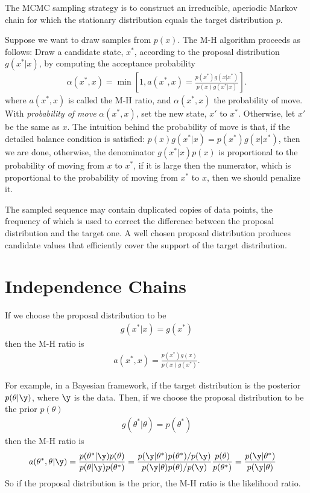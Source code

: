 \documentclass{article}
\begin{document}
The MCMC sampling strategy is to construct an irreducible, aperiodic Markov chain for which the stationary distribution equals the target distribution $p$.

Suppose we want to draw samples from $p(x)$. The M-H algorithm proceeds as follows: Draw a candidate state, $x^*$, according to the proposal distribution $g(x^*|x)$, by computing the acceptance probability
\begin{align}
\alpha(x^*, x) = \min\left[1, a(x^*,x) = \frac{p(x^*)g(x|x^*)}{p(x)g(x^*|x)}\right].
\end{align}
where $a(x^*,x)$ is called the M-H ratio, and $\alpha(x^*,x)$ the probability of move. With {\em{probability of move}} $\alpha(x^*, x)$, set the new state, $x'$ to $x^*$. Otherwise, let $x'$ be the same as $x$. The intuition behind the probability of move is that, if the detailed balance condition is satisfied: $p(x)g(x^*|x) = p(x^*)g(x|x^*)$, then we are done, otherwise, the denominator $g(x^*|x)p(x)$ is proportional to the probability of moving from $x$ to $x^*$, if it is large then the numerator, which is proportional to the probability of moving from $x^*$ to $x$, then we should penalize it.

The sampled sequence may contain duplicated copies of data points, the frequency of which is used to correct the difference between the proposal distribution and the target one. A well chosen proposal distribution produces candidate values that efficiently cover the support of the target distribution.

\section{Independence Chains}
If we choose the proposal distribution to be
\begin{align}
g(x^*|x) = g(x^*)
\end{align}
then the M-H ratio is
\begin{align}
a(x^*, x) = \frac{p(x^*)g(x)}{p(x)g(x^*)}.
\end{align}

For example, in a Bayesian framework, if the target distribution is the posterior $p(\theta|\y)$, where $\y$ is the data. Then, if we choose the proposal distribution to be the prior $p(\theta)$
\begin{align}
g(\theta^*|\theta) = p(\theta^*)
\end{align}
then the M-H ratio is
\begin{align}
a(\theta^*, \theta | \y) &= \frac{p(\theta^*|\y)p(\theta)}{p(\theta|\y)p(\theta^*)} = \frac{p(\y|\theta^*)p(\theta^*)/p(\y)}{p(\y|\theta)p(\theta)/p(\y)}\frac{p(\theta)}{p(\theta^*)} = \frac{p(\y|\theta^*)}{p(\y|\theta)}
\end{align}
So if the proposal distribution is the prior, the M-H ratio is the likelihood ratio.
\end{document}
